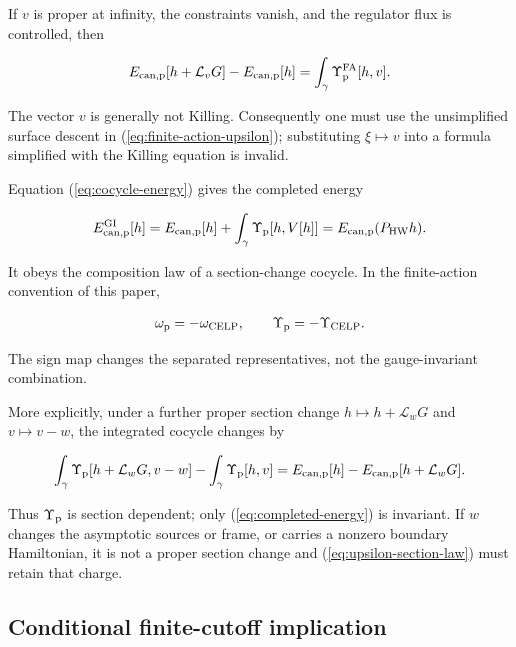 If $v$ is proper at infinity, the constraints vanish, and the regulator flux is controlled, then

\begin{align}
E_{{\rm can,p}}[h+\mathcal L_vG]-E_{{\rm can,p}}[h]
=\int_\gamma\Upsilon_{\rm p}^{\rm FA}[h,v]. \label{eq:cocycle-energy}
\end{align}

The vector $v$ is generally not Killing. Consequently one must use the unsimplified surface descent in (\ref{eq:finite-action-upsilon}); substituting $\xi\mapsto v$ into a formula simplified with the Killing equation is invalid.

Equation (\ref{eq:cocycle-energy}) gives the completed energy

\begin{align}
E_{{\rm can,p}}^{\rm GI}[h]
=E_{{\rm can,p}}[h]
+\int_\gamma\Upsilon_{\rm p}[h,V[h]]
=E_{{\rm can,p}}(P_{\rm HW}h). \label{eq:completed-energy}
\end{align}

It obeys the composition law of a section-change cocycle. In the finite-action convention of this paper,

\begin{align}
\omega_{\rm p}=-\omega_{\rm CELP},
\qquad
\Upsilon_{\rm p}=-\Upsilon_{\rm CELP}.
\end{align}

The sign map changes the separated representatives, not the gauge-invariant combination.

More explicitly, under a further proper section change $h\mapsto h+\mathcal L_wG$ and $v\mapsto v-w$, the integrated cocycle changes by

\begin{align}
\int_\gamma\Upsilon_{\rm p}[h+\mathcal L_wG,v-w]
-\int_\gamma\Upsilon_{\rm p}[h,v]
=E_{{\rm can,p}}[h]-E_{{\rm can,p}}[h+\mathcal L_wG].
\label{eq:upsilon-section-law}
\end{align}

Thus $\Upsilon_{\rm p}$ is section dependent; only (\ref{eq:completed-energy}) is invariant. If $w$ changes the asymptotic sources or frame, or carries a nonzero boundary Hamiltonian, it is not a proper section change and (\ref{eq:upsilon-section-law}) must retain that charge.

\subsection{Conditional finite-cutoff implication}\label{subsec:conditional-implication}

